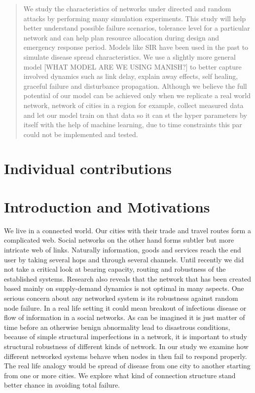 \documentclass[11pt]{article}
\begin{document}

\tableofcontents

\newpage


\begin{abstract}
We study the characteristics of networks under directed and random attacks by performing many simulation experiments. This study will help better understand possible failure scenarios, tolerance level for a particular network and can help plan resource allocation during design and emergency response period. Models like SIR have been used in the past to simulate disease spread characteristics. We use a slightly more general model [WHAT MODEL ARE WE USING MANISH?] to better capture involved dynamics such as link delay, explain away effects, self healing, graceful failure and disturbance propagation. Although we believe the full potential of our model can be achieved only when we replicate a real world network, network of cities in a region for example, collect measured data and let our model train on that data so it can st the hyper parameters by itself with the help of machine learning, due to time constraints this par could not be implemented and tested.
\end{abstract}
\clearpage

\section{Individual contributions}

\section{Introduction and Motivations}
We live in a connected world. Our cities with their trade and travel routes form a complicated web. Social networks on the other hand forms subtler but more intricate web of links. Naturally information, goods and services reach the end user by taking several hops and through several channels. Until recently we did not take a critical look at bearing capacity, routing and robustness of the established systems. Research also reveals that the network that has been created based mainly on supply-demand dynamics is not optimal in many aspects. One serious concern about any networked system is its robustness against random node failure. In a real life setting it could mean breakout of infectious disease or flow of information in a social networks. As can be imagined it is just matter of time before an otherwise benign abnormality lead to disastrous conditions, because of simple structural imperfections in a network, it is important to study structural robustness of different kinds of network. In our study we examine how different networked systems behave when nodes in then fail to respond properly. The real life analogy would be spread of disease from one city to another starting from one or more cities. We explore what kind of connection structure stand better chance in avoiding total failure.
\end{document}
